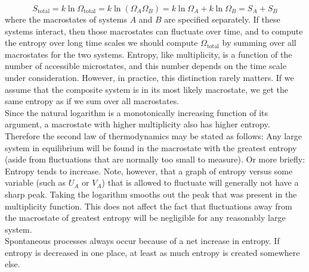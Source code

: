 \documentclass[11pt]{exam}
\begin{document}
\begin{equation}\tag{2.48}
S_{\text{total}}=k\ln{\Omega_{\text{total}}}=k\ln{(\Omega_A\Omega_B)}=k\ln{\Omega_A}+k\ln{\Omega_B}=S_A+S_B    
\end{equation}
where the macrostates of systems $A$ and $B$ are specified separately. If these systems interact, then those macrostates can fluctuate over time, and to compute the entropy over long time scales we should compute $\Omega_{\text{total}}$ by summing over all macrostates for the two systems. Entropy, like multiplicity, is a function of the number of accessible microstates, and this number depends on the time scale under consideration. However, in practice, this distinction rarely matters. If we assume that the composite system is in its most likely macrostate, we get the same entropy as if we sum over all macrostates.\\
\hspace*{10mm}Since the natural logarithm is a monotonically increasing function of its argument, a macrostate with higher multiplicity also has higher entropy. Therefore the second law of thermodynamics may be stated as follows: Any large system in equilibrium will be found in the macrostate with the greatest entropy (aside from fluctuations that are normally too small to measure). Or more briefly: Entropy tends to increase. Note, however, that a graph of entropy versus some variable (such as $U_A$ or $V_A$) that is allowed to fluctuate will generally not have a sharp peak. Taking the logarithm smooths out the peak that was present in the multiplicity function. This does not affect the fact that fluctuations away from the macrostate of greatest entropy will be negligible for any reasonably large system.\\
\hspace*{10mm}Spontaneous processes always occur because of a net increase in entropy. If entropy is decreased in one place, at least as much entropy is created somewhere else. 
\end{document}
